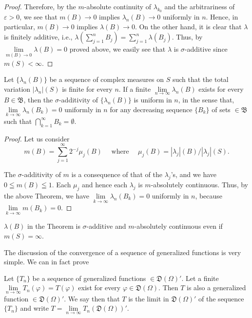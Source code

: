 \begin{proof}
Therefore, by the $m$-absolute continuity of $\lambda_{k_0}$ and the arbitrariness of $\varepsilon > 0$, we see that $m(B) \to 0$ implies $\lambda_n(B) \to 0$ uniformly in $n$. Hence, in particular, $m(B) \to 0$ implies $\lambda(B) \to 0$. On the other hand, it is clear that $\lambda$ is finitely additive, i.e., $\lambda\left(\sum\limits_{j=1}^{n} B_j\right) = \sum\limits_{j=1}^{n} \lambda(B_j)$. Thus, by $\lim\limits_{m(B) \to 0} \lambda(B) = 0$ proved above, we easily see that $\lambda$ is $\sigma$-additive since $m(S) < \infty$. 
\end{proof}

\begin{corollary}\label{cor:II.2.Corollary.1} Let $\{\lambda_n(B)\}$ be a sequence of complex measures on $S$ such that the total variation $|\lambda_n|(S)$ is finite for every $n$. If a finite $\lim\limits_{n\to \infty}\lambda_n(B)$ exists for every $B\in \mathfrak{B}$, then the $\sigma$-additivity of $\{\lambda_n(B)\}$ is uniform in $n$, in the sense that, $\lim\limits_{k\to \infty}\lambda_n(B_k) = 0$ uniformly in $n$ for any decreasing sequence $\{B_k\}$ of sets $\in \mathfrak{B}$ such that $\bigcap\limits_{k=1}^{\infty}B_k = \emptyset$. 
\end{corollary}

\begin{proof}
 Let us consider 
\[
m (B) = \sum\limits_{j=1} ^{\infty} 2 ^{-j} \mu_{j} (B) \quad \text{ where } \quad \mu_{j} (B) = | \lambda_{j} | (B) / | \lambda_{j} | (S). \]

The $\sigma$-additivity of $m$ is a consequence of that of the $\lambda_j$'s, and we have $0 \leqq m(B) \leqq 1$. Each $\mu_j$ and hence each $\lambda_j$ is $m$-absolutely continuous. Thus, by the above Theorem, we have $\lim\limits_{k \to \infty} \lambda_n(B_k) = 0$ uniformly in $n$, because $\lim\limits_{k \to \infty} m(B_k) = 0$. 
\end{proof}

\begin{corollary}\label{cor:II.2.Corollary.2} $\lambda(B)$ in the Theorem is $\sigma$-additive and $m$-absolutely continuous even if $m(S)=\infty$. 
\end{corollary}


\label{sec:II.3}

The discussion of the convergence of a sequence of generalized functions is very simple. We can in fact prove 

\begin{theoremu} Let $\{T_n\}$ be a sequence of generalized functions $\in \mathfrak{D}(\Omega)'$. Let a finite $\lim\limits_{n\to \infty}T_n(\varphi) = T(\varphi)$ exist for every $\varphi \in \mathfrak{D}(\Omega)$. Then $T$ is also a generalized function $\in \mathfrak{D}(\Omega)'$. We say then that $T$ is the limit in $\mathfrak{D}(\Omega)'$ of the sequence $\{T_n\}$ and write $T = \lim\limits_{n\to \infty}T_n(\mathfrak{D}(\Omega))'$. 
\end{theoremu}


